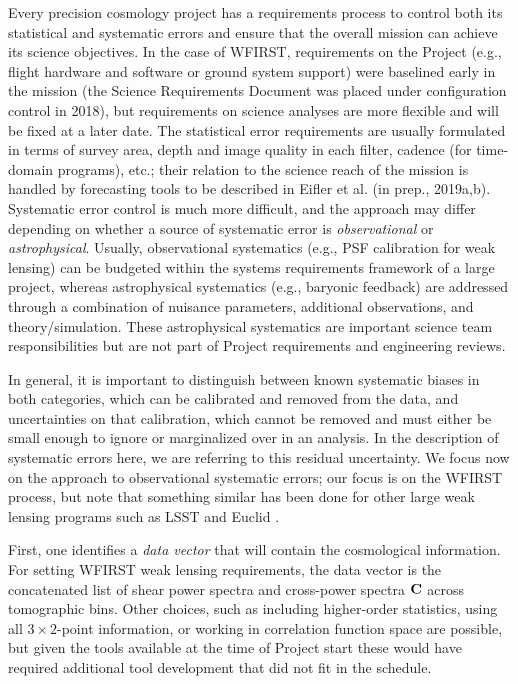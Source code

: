 \documentclass[usenatbib]{mnras}
\begin{document}
Every precision cosmology project has a requirements process to control both its statistical and systematic errors and ensure that the overall mission can achieve its science objectives. In the case of WFIRST, requirements on the Project (e.g., flight hardware and software or ground system support) were baselined early in the mission (the Science Requirements Document was placed under configuration control in 2018), but requirements on science analyses are more flexible and will be fixed at a later date. The statistical error requirements are usually formulated in terms of survey area, depth and image quality in each filter, cadence (for time-domain programs), etc.; their relation to the science reach of the mission is handled by forecasting tools to be described in Eifler et al. (in prep., 2019a,b). Systematic error control is much more difficult, and the approach may differ depending on whether a source of systematic error is {\em observational} or {\em astrophysical}. Usually, observational systematics (e.g., PSF calibration for weak lensing) can be budgeted within the systems requirements framework of a large project, whereas astrophysical systematics (e.g., baryonic feedback) are addressed through a combination of nuisance parameters, additional observations, and theory/simulation. These astrophysical systematics are important science team responsibilities but are not part of Project requirements and engineering reviews.

In general, it is important to distinguish between known systematic biases in both categories, which can be calibrated and removed from the data, and uncertainties on that calibration, which cannot be removed and must either be small enough to ignore or marginalized over in an analysis. In the description of systematic errors here, we are referring to this residual uncertainty. We focus now on the approach to observational systematic errors; our focus is on the WFIRST process, but note that something similar has been done for other large weak lensing programs such as LSST and Euclid \citep{euclid_srd,2016SPIE.9911E..05V,LPM-17,2018arXiv180901669T,LSE-29}.

First, one identifies a {\em data vector} that will contain the cosmological information. For setting WFIRST weak lensing requirements, the data vector is the concatenated list of shear power spectra and cross-power spectra ${\bf C}$ across tomographic bins. Other choices, such as including higher-order statistics, using all $3\times 2$-point information, or working in correlation function space are possible, but given the tools available at the time of Project start these would have required additional tool development that did not fit in the schedule.
\end{document}
